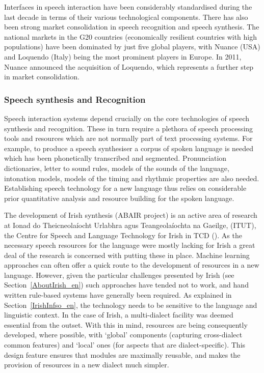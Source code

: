 \begin{multicols}{2}
Interfaces in speech interaction have been considerably standardised during the last decade in terms of their various technological components. There has also been strong market consolidation in speech recognition and speech synthesis. The national markets in the G20 countries (economically resilient countries with high populations) have been dominated by just five global players, with Nuance (USA) and Loquendo (Italy) being the most prominent players in Europe. In 2011, Nuance announced the acquisition of Loquendo, which represents a further step in market consolidation.

\subsubsection*{Speech synthesis and Recognition}

Speech interaction systems depend crucially on the core technologies of speech synthesis and recognition. These in turn require a plethora of speech processing tools and resources which are not normally part of text processing systems. For example, to produce a speech synthesiser a corpus of spoken language is needed which has been phonetically transcribed and segmented. Pronunciation dictionaries, letter to sound rules, models of the sounds of the language, intonation models, models of the timing and rhythmic properties are also needed. Establishing speech technology for a new language thus relies on considerable prior quantitative analysis and resource building for the spoken language.

The development of Irish synthesis (ABAIR project) is an active area of research at Ionad do Theicneolaíocht Urlabhra agus Teangeolaíochta na Gaeilge, (ITUT), the Centre for Speech and Language Technology for Irish in TCD (\cite{pittsburgh}).  As the necessary speech resources for the language were mostly lacking for Irish a great deal of the research is concerned with putting these in place. Machine learning approaches can often offer a quick route to the development of resources in a new language. However, given the particular challenges presented by Irish (see Section~\ref{AboutIrish_en}) such approaches have tended not to work, and hand written rule-based systems have generally been required. As explained in Section~\ref{IrishInfso_en}, the technology needs to be sensitive to the language and linguistic context. In the case of Irish, a multi-dialect facility was deemed essential from the outset. With this in mind, resources are being consequently developed, where possible, with `global’ components (capturing cross-dialect common features) and `local' ones (for aspects that are dialect-specific). This design feature ensures that modules are maximally reusable, and makes the provision of resources in a new dialect much simpler.


\end{multicols}
